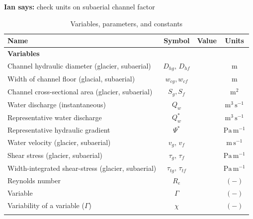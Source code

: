 \documentclass[11pt]{article}
\newcommand{\ian}[1]{{\textbf{\color{blue}Ian says:} \color{blue} #1} }
\begin{document}
\begin{spacing}{1}
  \ian{check units on subaerial channel factor}
  \begin{table}[H]
    \centering
    \caption{Variables, parameters, and constants }
    \begin{tabular}{ l  c  c c }
      Name &Symbol&  Value&Units \\ \hline
      \textbf{Variables}  & & & \\
      Channel hydraulic diameter (glacier, subaerial) &  $D_{hg},\,D_{hf}$&  & $\mathrm{m}$     \\
      Width of channel floor (glacial, subaerial) & $w_{cg},w_{cf}$&  & $\mathrm{m}$     \\
      Channel cross-sectional area (glacier, subaerial) &  $S_g, S_f$& & $\mathrm{m^2}$     \\
      Water discharge (instantaneous) & $Q_w$& & $\mathrm{m^{3}\,s^{-1}}$ \\
      Representative water discharge & $Q_{w}^*$& & $\mathrm{m^{3}\,s^{-1}}$ \\
      Representative hydraulic gradient  &$\Psi^*$ & & $\mathrm{Pa\, m^{-1}}$\\
      Water velocity (glacier, subaerial)  & $v_g,\,v_{f}$& & $\mathrm{m\,s^{-1}}$ \\
      Shear stress (glacier, subaerial) & $\tau_g,\,\tau_f$&& $\mathrm{Pa \, m^{-1}}$ \\
      Width-integrated shear-stress (glacier, subaerial) & $\tau_{tg},\, \tau_{tf}$&& $\mathrm{Pa \, m^{-1}}$ \\
      Reynolds number &$R_e$& & $\mathrm{(-)}$\\
      Variable &$\Gamma$&&$\mathrm{(-)}$\\
      Variability of a variable ($\Gamma$) &$\chi$& &$\mathrm{(-)}$\\
           &&&\\
      

\end{tabular}
\end{table}
\end{spacing}
\end{document}
